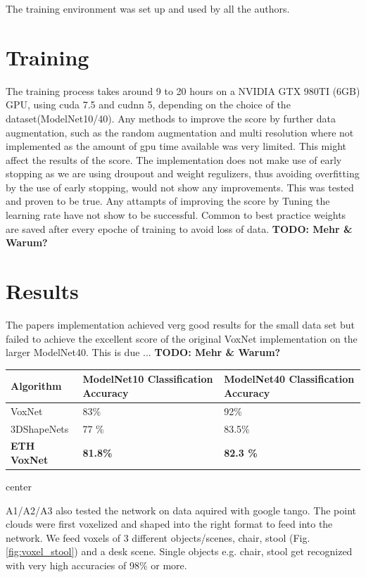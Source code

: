 \documentclass[10pt,twocolumn,letterpaper]{article}
\begin{document}
The training environment was set up and used by all the authors. 

 
\section{Training}

The training process takes around 9 to 20 hours on a NVIDIA GTX 980TI (6GB) GPU, using cuda 7.5 and cudnn 5, depending on the choice of the dataset(ModelNet10/40). Any methods to improve the score by further data augmentation, such as the random augmentation and multi resolution where not implemented as the amount of gpu time available was very limited. This might affect the results of the score. 
The implementation does not make use of early stopping as we are using droupout and weight regulizers, thus avoiding overfitting by the use of early stopping, would not show any improvements. This was tested and proven to be true. Any attampts of improving the score by Tuning the learning rate have not show to be successful.
Common to best practice weights are saved after every epoche of training to avoid loss of data. \textbf{TODO: Mehr \& Warum?} \\ 

\section{Results}

The papers implementation achieved verg good results for the small data set but failed to achieve the excellent score of the 
original VoxNet implementation on the larger ModelNet40. 
This is due ... \textbf{TODO: Mehr \& Warum?} \\ 
\begin{center}
\begin{tabular}{ |p{2.3cm}||p{2.3cm}|p{2.3cm}|  }
 \hline
 Algorithm & ModelNet10 Classification Accuracy  & ModelNet40 Classification Accuracy \\
 \hline
 VoxNet \cite{voxnet}   & 83\% & 92\% \\
 3DShapeNets  \cite{shape}   & 77 \% & 83.5\% \\
\textbf{ETH VoxNet}    & \textbf{81.8\%}   & \textbf{82.3 \%}  \\
 \hline
\end{tabular}
\end{center}{center}

\vspace{0.3cm}
A1/A2/A3 also tested the network on data aquired with google tango. The point clouds were first voxelized
and shaped into the right format to feed into the network. We feed voxels of 3 different objects/scenes, chair, 
stool (Fig. \ref{fig:voxel_stool}) and a desk scene. Single objects e.g. chair, stool get recognized with very high accuracies of 98\% or more.
\end{document}
